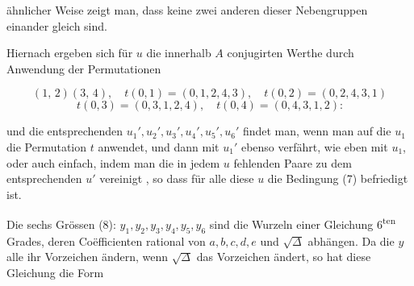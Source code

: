 
ähnlicher Weise zeigt man, dass keine zwei anderen dieser
Nebengruppen einander gleich sind.

Hiernach ergeben sich für $u$ die innerhalb $A$ conjugirten
Werthe durch Anwendung der Permutationen

\[
(1,\,2)(3,\,4), \quad t(0,1) = (0,1,2,4,3), \quad t(0,2) = (0,2,4,3,1)
\]
\[
t(0,3) = (0,3,1,2,4), \quad t(0,4) = (0,4,3,1,2)\text{:}
\]


und die entsprechenden $u_1', u_2', u_3', u_4', u_5', u_6'$ findet man, wenn
man auf die $u_1$ die Permutation $t$ anwendet, und dann mit $u_1'$
ebenso verfährt, wie eben mit $u_1$, oder auch einfach, indem man
die in jedem $u$ fehlenden Paare zu dem entsprechenden $u'$ vereinigt
, so dass für alle diese $u$ die Bedingung (7) befriedigt ist.


Die sechs Grössen (8): $y_1, y_2, y_3, y_4, y_5, y_6$ sind die Wurzeln einer
Gleichung 6\textsuperscript{ten} Grades, deren Coëfficienten rational von $a, b, c, d, e$
und $\sqrt{\varDelta}$ abhängen. Da die $y$ alle ihr Vorzeichen ändern, wenn
$\sqrt{\varDelta}$ das Vorzeichen ändert, so hat diese Gleichung die Form

